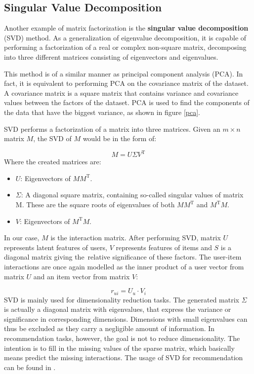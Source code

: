 \subsection*{Singular Value Decomposition}
Another example of matrix factorization is the \textbf{singular value decomposition} (SVD) method. As a generalization of eigenvalue decomposition, it is capable of performing a factorization of a real or complex non-square matrix, decomposing into three different matrices consisting of eigenvectors and eigenvalues. 

This method is of a similar manner as principal component analysis (PCA). In fact, it is equivalent to performing PCA on the covariance matrix of the dataset. A covariance matrix is a square matrix that contains variance and covariance values between the factors of the dataset. PCA is used to find the components of the data that have the biggest variance, as shown in figure \ref{pca}.

SVD performs a factorization of a matrix into three matrices. Given an $m \times n$ matrix $M$, the SVD of $M$ would be in the form of:

$$ M = U \Sigma V^\text{T} $$
Where the created matrices are:
\begin{itemize}
    \item $U$: Eigenvectors of $M M^\text{T}$.
    \item $\Sigma$: A diagonal square matrix, containing so-called singular values of matrix M. These are the square roots of eigenvalues of both $M M^\text{T}$ and $M^\text{T} M$.
    \item $V$: Eigenvectors of $M^\text{T} M$.
\end{itemize}
In our case, $M$ is the interaction matrix. After performing SVD, matrix $U$ represents latent features of users, $V$ represents features of items and $S$ is a diagonal matrix giving the~relative significance of these factors. The user-item interactions are once again modelled as the inner product of a user vector from matrix $U$ and an item vector from matrix $V$:

$$r_{ui} = U_{u} \cdot V_{i}$$
SVD is mainly used for dimensionality reduction tasks. The generated matrix $\Sigma$ is actually a diagonal matrix with eigenvalues, that express the variance or significance in corresponding dimensions. Dimensions with small eigenvalues can thus be excluded as they carry a negligible amount of information. In recommendation tasks, however, the goal is not to reduce dimensionality. The intention is to fill in the missing values of the sparse matrix, which basically means predict the missing interactions. The usage of SVD for recommendation can be found in \cite{SVD}.


